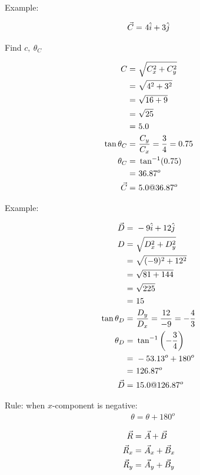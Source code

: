 	Example:

	\begin{align}
		\vec{C} = \ &4\hat{i} + 3\hat{j}& \notag
	\end{align}

	Find $c, \ \theta_{C}$

	\begin{align}
		C = \ &\sqrt{C_{x}^{2}+C_{y}^{2}}& \notag \\
		= \ &\sqrt{4^{2}+3^{2}}& \notag \\
		= \ &\sqrt{16+9}& \notag \\
		= \ &\sqrt{25}& \notag \\
		= \ &5.0& \notag \\
		\tan \theta_{C} = \ &\frac{C_{y}}{C_{x}} = \frac{3}{4} = 0.75& \notag \\
		\theta_{C} = \ &\tan^{-1} (0.75)& \notag \\
		= \ &36.87^{o}& \notag \\
		\vec{C} = \ &5.0 @ 36.87^{o}& \notag
	\end{align}

	Example:

	\begin{align}
		\vec{D} = \ &-9\hat{i} + 12\hat{j}& \notag \\
		D = \ &\sqrt{D_{x}^{2}+D_{y}^{2}}& \notag \\
		= \ &\sqrt{(-9)^{2}+12^{2}}& \notag \\
		= \ &\sqrt{81+144}& \notag \\
		= \ &\sqrt{225}& \notag \\
		= \ &15& \notag \\
		\tan \theta_{D} = \ &\frac{D_{y}}{D_{x}} = \frac{12}{-9} = - \frac{4}{3}& \notag \\
		\theta_{D} = \ &\tan^{-1} \left( -\frac{3}{4} \right)& \notag \\
		= \ &-53.13^{o} + 180^{o}& \notag \\
		= \ &126.87^{o}& \notag \\
		\vec{D} = \ &15.0 @ 126.87^{o}& \notag
	\end{align}

	Rule: when $x$-component is negative:
	\begin{align}
		\theta = \theta + 180^{o}
	\end{align}

	\begin{align}
		\vec{R} = \ &\vec{A} + \vec{B}& \notag \\
		\vec{R}_{x} = \ &\vec{A}_{x} + \vec{B}_{x}& \notag \\
		\vec{R}_{y} = \ &\vec{A}_{y} + \vec{B}_{y}& \notag \\
	\end{align}


